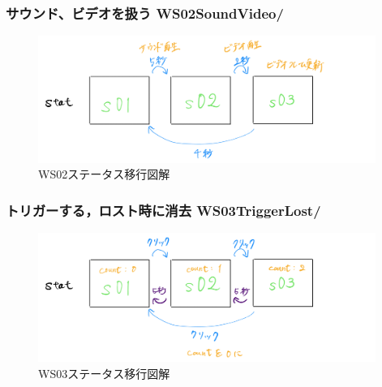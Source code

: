 \documentclass[10pt, dvipdfmx]{beamer}
\begin{document}

        \begin{frame}
            \frametitle{サウンド、ビデオを扱う WS02SoundVideo/}
            \begin{figure}[htb]
                 \includegraphics[width=110mm]{images/ws02-1.png}
                 \caption{WS02ステータス移行図解}
                \label{fig:13}
            \end{figure}
        \end{frame}

        \begin{frame}
            \frametitle{トリガーする，ロスト時に消去 WS03TriggerLost/}
            \begin{figure}[htb]
                 \includegraphics[width=110mm]{images/ws03-1.png}
                 \caption{WS03ステータス移行図解}
                \label{fig:14}
            \end{figure}
        \end{frame}
\end{document}
